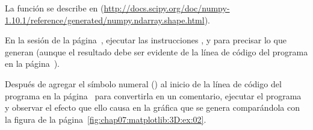 \begin{appendices}
\begin{prob}
\begin{mymdframed}
\begin{lstlisting}[basicstyle=\ttfamily\scriptsize,frame=single]
\end{lstlisting}
La función {\numpy}  se describe en
(\url{http://docs.scipy.org/doc/numpy-1.10.1/reference/generated/numpy.ndarray.shape.html}).
\end{mymdframed}
%
\end{prob}
%
\begin{prob}
\label{chap07:prob10}
En la sesión {\ipython} de la página~\pageref{code:chap07:matplotlib3D:02:in},
ejecutar las instrucciones , 
 y  para precisar lo que generan
(aunque el resultado debe ser evidente de la línea de código
 del programa en 
la página~\pageref{code:chap07:matplotlib3D:prog:02}). 
\end{prob}
%
\begin{prob}
\label{chap07:prob11}
Después de
agregar el símbolo numeral (\mytext{\#}) al inicio
de la línea de código  del programa en la
página~\pageref{code:chap07:matplotlib3D:prog:02} para convertirla
en un comentario, ejecutar 
el programa y observar el efecto que ello causa en la gráfica 
que se genera comparándola con la figura de la 
página~\ref{fig:chap07:matplotlib:3D:ex:02}.
\end{prob}
%

\end{appendices}

